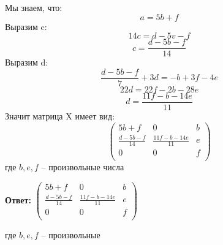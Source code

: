 \documentclass[a4paper,12pt]{article}
\begin{document}
Мы знаем, что:
\[
a = 5b + f
\]
Выразим c:
\[
14c = d - 5v - f
\]
\[
c = \frac{d-5b-f}{14}
\]
Выразим d:
\[
\frac{d-5b-f}{7} + 3d = -b + 3f - 4e
\]
\[
22d = 22f - 2b - 28e
\]
\[
d = \frac{11f-b-14e}{11}
\]
Значит матрица X имеет вид:
\[
\begin{pmatrix}
5b+f & 0 & b\\
\frac{d-5b-f}{14} & \frac{11f-b-14e}{11} & e\\
0 & 0 & f\\
\end{pmatrix}
\]
где $b, e, f$ -- произвольные числа
\begin{large}
\begin{center}
\textbf{Ответ:}
$
\begin{pmatrix}
5b+f & 0 & b\\
\frac{d-5b-f}{14} & \frac{11f-b-14e}{11} & e\\
0 & 0 & f\\
\end{pmatrix} 
$
\end{center}
\begin{center}
где $b, e, f$ -- произвольные 
\end{center}
\end{large}
\end{document}

